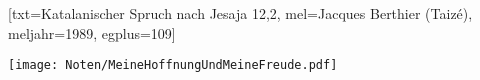 [txt={Katalanischer Spruch nach Jesaja 12,2}, mel={Jacques Berthier (Taizé)}, meljahr={1989}, egplus={109}]

\beginverse
\endverse
\texttt{[image: Noten/MeineHoffnungUndMeineFreude.pdf]}

\endsong